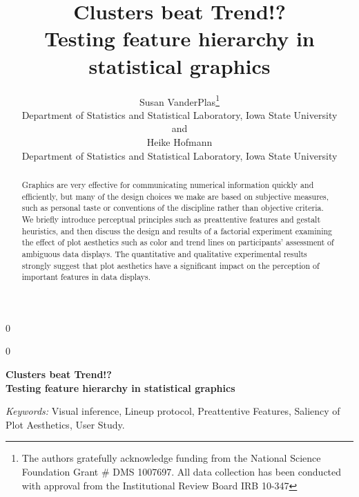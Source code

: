 \documentclass[12pt]{article}\usepackage[]{graphicx}\usepackage[]{color}
\newcommand{\blind}{0}
\begin{document}
%

\def\spacingset#1{\renewcommand{\baselinestretch}%
{#1}\small\normalsize} \spacingset{1}



\blind
{
  \title{\bf Clusters beat Trend!? \\Testing feature hierarchy in statistical graphics}
  \author{Susan VanderPlas\thanks{
    The authors gratefully acknowledge funding from the National Science Foundation Grant \# DMS 1007697. All data collection has been conducted with approval from the Institutional Review Board IRB 10-347}\hspace{.2cm}\\
    Department of Statistics and Statistical Laboratory, Iowa State University\\
    and \\
    Heike Hofmann\\
    Department of Statistics and Statistical Laboratory, Iowa State University}
  \maketitle
} \fi

\blind
{
  \bigskip
  \bigskip
  \bigskip
  \begin{center}
    {\LARGE\bf Clusters beat Trend!? \\Testing feature hierarchy in statistical graphics}
\end{center}
  \medskip
} \fi

\bigskip
\begin{abstract}
Graphics are very effective for communicating numerical information quickly and efficiently, but many of the design choices we make are based on subjective measures, such as personal taste or conventions of the discipline rather than objective criteria. We briefly introduce perceptual principles such as preattentive features and gestalt heuristics, and then discuss the design and results of a factorial experiment examining the effect of plot aesthetics such as color and trend lines on participants' assessment of ambiguous data displays. The quantitative and qualitative experimental results strongly suggest that plot aesthetics have a significant impact on the perception of important features in data displays. 
\end{abstract}

\noindent%
{\it Keywords:}  Visual inference, Lineup protocol, Preattentive Features, Saliency of Plot Aesthetics, User Study.
\vfill
\end{document}

